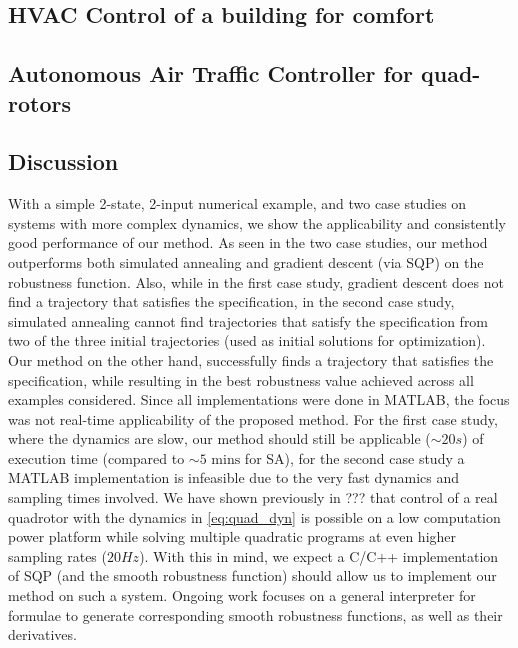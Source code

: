\subsection{HVAC Control of a building for comfort}



\subsection{Autonomous Air Traffic Controller for quad-rotors}


\subsection{Discussion}
With a simple 2-state, 2-input numerical example, and two case studies on systems with more complex dynamics, we show the applicability and consistently good performance of our method. As seen in the two case studies, our method outperforms both simulated annealing and gradient descent (via SQP) on the robustness function. Also, while in the first case study, gradient descent does not find a trajectory that satisfies the specification, in the second case study, simulated annealing cannot find trajectories that satisfy the specification from two of the three initial trajectories (used as initial solutions for optimization). Our method on the other hand, successfully finds a trajectory that satisfies the specification, while resulting in the best robustness value achieved across all examples considered. 
Since all implementations were done in MATLAB, the focus was not real-time applicability of the proposed method. For the first case study, where the dynamics are slow, our method should still be applicable ($\sim 20s$) of execution time (compared to $\sim 5 \text{ mins}$ for SA), for the second case study a MATLAB implementation is infeasible due to the very fast dynamics and sampling times involved. We have shown previously in ??? that control of a real quadrotor with the dynamics in \eqref{eq:quad_dyn} is possible on a low computation power platform while solving multiple quadratic programs at even higher sampling rates ($20Hz$). With this in mind, we expect a C/C++ implementation of SQP (and the smooth robustness function) should allow us to implement our method on such a system. Ongoing work focuses on a general interpreter for formulae to generate corresponding smooth robustness functions, as well as their derivatives.